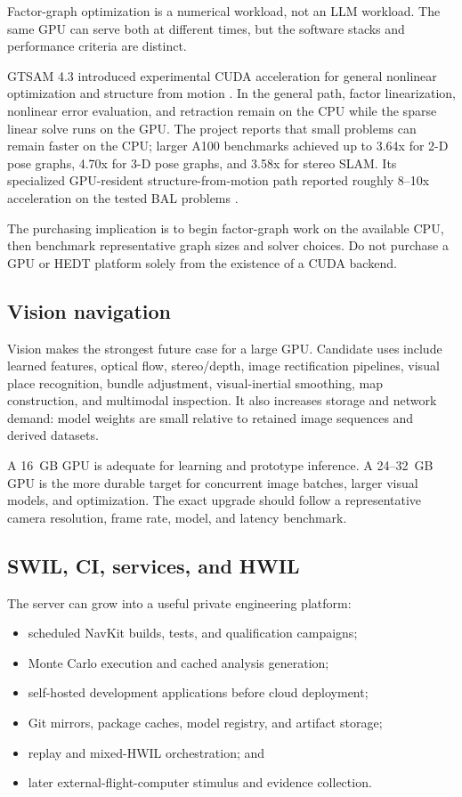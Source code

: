 \documentclass[11pt]{article}
\begin{document}
Factor-graph optimization is a numerical workload, not an LLM workload. The
same GPU can serve both at different times, but the software stacks and
performance criteria are distinct.

GTSAM 4.3 introduced experimental CUDA acceleration for general nonlinear
optimization and structure from motion \cite{gtsam_43}. In the general path,
factor linearization, nonlinear error evaluation, and retraction remain on the
CPU while the sparse linear solve runs on the GPU. The project reports that
small problems can remain faster on the CPU; larger A100 benchmarks achieved
up to 3.64x for 2-D pose graphs, 4.70x for 3-D pose graphs, and 3.58x for stereo
SLAM. Its specialized GPU-resident structure-from-motion path reported roughly
8--10x acceleration on the tested BAL problems \cite{gtsam_cuda}.

The purchasing implication is to begin factor-graph work on the available CPU,
then benchmark representative graph sizes and solver choices. Do not purchase
a GPU or HEDT platform solely from the existence of a CUDA backend.

\subsection{Vision navigation}

Vision makes the strongest future case for a large GPU. Candidate uses include
learned features, optical flow, stereo/depth, image rectification pipelines,
visual place recognition, bundle adjustment, visual-inertial smoothing, map
construction, and multimodal inspection. It also increases storage and network
demand: model weights are small relative to retained image sequences and
derived datasets.

A 16~GB GPU is adequate for learning and prototype inference. A 24--32~GB GPU
is the more durable target for concurrent image batches, larger visual models,
and optimization. The exact upgrade should follow a representative camera
resolution, frame rate, model, and latency benchmark.

\subsection{SWIL, CI, services, and HWIL}

The server can grow into a useful private engineering platform:

\begin{itemize}
  \item scheduled NavKit builds, tests, and qualification campaigns;
  \item Monte Carlo execution and cached analysis generation;
  \item self-hosted development applications before cloud deployment;
  \item Git mirrors, package caches, model registry, and artifact storage;
  \item replay and mixed-HWIL orchestration; and
  \item later external-flight-computer stimulus and evidence collection.
\end{itemize}
\end{document}
